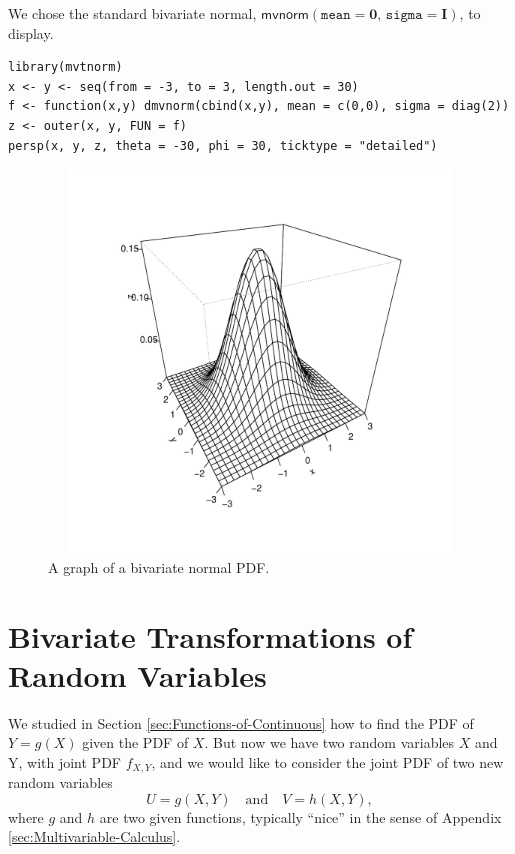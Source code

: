 \documentclass[captions=tableheading]{scrbook}
\begin{document}
We chose the standard bivariate normal, \(\mathsf{mvnorm}(\mathtt{mean}=\mathbf{0},\,\mathtt{sigma}=\mathbf{I})\), to display.


\begin{verbatim}
library(mvtnorm)
x <- y <- seq(from = -3, to = 3, length.out = 30)
f <- function(x,y) dmvnorm(cbind(x,y), mean = c(0,0), sigma = diag(2))
z <- outer(x, y, FUN = f)
persp(x, y, z, theta = -30, phi = 30, ticktype = "detailed")
\end{verbatim}



\begin{figure}[th]
    \includegraphics[width=5in, height=4in]{img/mvnorm-pdf.pdf}
    \caption[Graph of a bivariate normal PDF]{\small A graph of a bivariate normal PDF.}
    \label{fig:mvnorm-pdf}
  \end{figure}
\section{Bivariate Transformations of Random Variables}
\label{sec-7-7}

\label{sec:Transformations-Multivariate}

We studied in Section \ref{sec:Functions-of-Continuous} how to find the PDF of \(Y=g(X)\) given the PDF of \(X\). But now we have two random variables \(X\) and Y, with joint PDF \(f_{X,Y}\), and we would like to consider the joint PDF of two new random variables
\begin{equation}
U=g(X,Y)\quad\mbox{and}\quad V=h(X,Y),
\end{equation}
where \(g\) and \(h\) are two given functions, typically ``nice'' in the sense of Appendix \ref{sec:Multivariable-Calculus}. 
\end{document}
